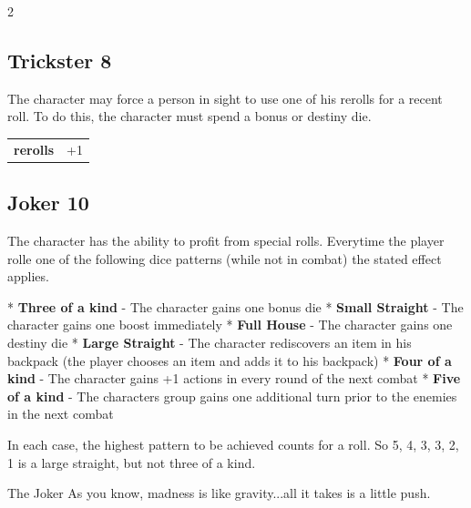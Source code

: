 \begin{multicols}{2}
\begin{tcolorbox}
\end{tcolorbox}

\begin{tcolorbox}
    \subsection*{Trickster \hfill \small{8 }}
    \tcblower
The character may force a person in sight to use one of his rerolls for a recent roll. To do this, the character must spend a bonus or destiny die.


\vspace{3mm}

\begin{tabular}{@{}ll@{}}
    \textbf{rerolls} & +1\\
\end{tabular}


\end{tcolorbox}

\begin{tcolorbox}
    \subsection*{Joker \hfill \small{10 }}
    \tcblower
The character has the ability to profit from special rolls. Everytime the player rolle one of the following dice patterns (while not in combat) the stated effect applies.

* \textbf{Three of a kind} - The character gains one bonus die
* \textbf{Small Straight} - The character gains one boost immediately
* \textbf{Full House} - The character gains one destiny die
* \textbf{Large Straight} - The character rediscovers an item in his backpack (the player chooses an item and adds it to his backpack)
* \textbf{Four of a kind} - The character gains +1 actions in every round of the next combat
* \textbf{Five of a kind} - The characters group gains one additional turn prior to the enemies in the next combat

In each case, the highest pattern to be achieved counts for a roll. So 5, 4, 3, 3, 2, 1 is a large straight, but not three of a kind.

\begin{pquote}{The Joker}
As you know, madness is like gravity...all it takes is a little push.
\end{pquote}


\end{tcolorbox}
\end{multicols}

